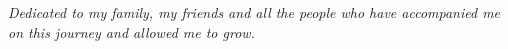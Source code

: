 \vspace*{\fill}
\begin{center}
\emph{Dedicated to my family, my friends and all the people who have accompanied me on this journey and allowed me to grow.}
\end{center}
\vspace*{\fill}

\newpage